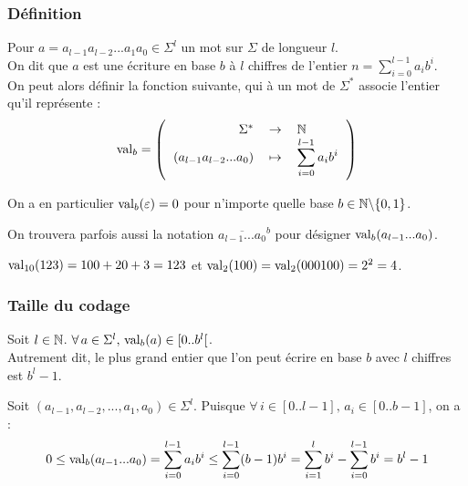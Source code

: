 		\subsubsection{Définition}
		
			\eqskip{3mm}
			\colsep{2.2pt}
			\begin{Definition}
				Pour \(a = a_{l-1}a_{l-2}...a_1a_0 \in \Sigma^l\) un mot sur \(\Sigma\) de longueur \(l\). \\
				On dit que \(a\) est une écriture en base \(b\) à \(l\) chiffres de l'entier \(n = \displaystyle \sum_{i=0}^{l-1} a_ib^i\). \\[1mm]
				On peut alors définir la fonction suivante, qui à un mot de \(\Sigma^*\) associe l'entier qu'il représente\,\,:
					\[
						\val_b = \fun{\Sigma^*}{\bb{N}}{(a_{l-1}a_{l-2}...a_0)}{\displaystyle \sum_{i=0}^{l-1} a_ib^i}
					\]
			\end{Definition}
			
				\begin{Remarque}
					On a en particulier \(\operatorname{val}_b (\varepsilon) = 0\) pour n'importe quelle base \(b \in \mathbb{N}\backslash\{0,1\}\).
				\end{Remarque}
		
				\begin{Remarque}
					On trouvera parfois aussi la notation \(\overline{a_{l-1}...a_0}^b\) pour désigner \(\operatorname{val}_b(a_{l-1}...a_0)\).
				\end{Remarque}
			
				\begin{Exemples}
					\(\operatorname{val}_{10}(123) = 100+20+3=123\) et
					\(\operatorname{val}_2(100) = \operatorname{val}_2(000100) = 2^2 = 4\).
				\end{Exemples}
		
		\subsubsection{Taille du codage}
		
			\begin{Lemme}
				Soit \(l \in \mathbb{N}\). \(\forall\,a\in\Sigma^l, \,\operatorname{val}_b(a) \in [0..b^l[\). \\
				Autrement dit, le plus grand entier que l'on peut écrire en base \(b\) avec \(l\) chiffres est \(b^l-1\).
			\end{Lemme}
			
				\eqskip{2mm}
				\begin{Preuve}
					Soit \((a_{l-1},a_{l-2},\!...,a_1,a_0)\in\Sigma^l\). Puisque \(\forall \,i\in[0..l-1], \,a_i \in [0..b-1]\), on a :
						\begin{align*}
							0 \leq \operatorname{val}_b(a_{l-1}...a_0) = \sum_{i=0}^{l-1} a_ib^i \leq \sum_{i=0}^{l-1} (b-1)b^i = \sum_{i=1}^{l} b^i - \sum_{i=0}^{l-1} b^i = b^l - 1
						\end{align*}
				\end{Preuve}
		
